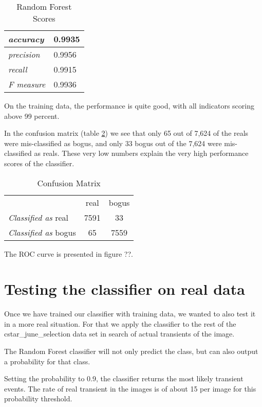 \begin{table}
\centering
\begin{tabular}{| >{\itshape}l | l |}
  \hline
  accuracy & 0.9935 \\ \hline
  precision & 0.9956 \\ \hline
  recall & 0.9915 \\ \hline
  F measure & 0.9936 \\ \hline
\end{tabular}
\caption{Random Forest Scores}
\label{mlscores}
\end{table}

On the training data, the performance is quite good, with all indicators scoring above 99 percent.

In the confusion matrix (table \ref{mlconfusionmatrix}) we see that only 65 out of 7,624 of the reals were mis-classified as bogus, and only 33 bogus out of the 7,624 were mis-classified as reals. These very low numbers explain the very high performance scores of the classifier.

\begin{table}
\centering
\begin{tabular}{ l|c|c| }
\multicolumn{1}{r}{}
 &  \multicolumn{1}{c}{real}
 & \multicolumn{1}{c}{bogus} \\
\cline{2-3}
{\it Classified as} real & 7591 & 33 \\
\cline{2-3}
{\it Classified as} bogus & 65 & 7559 \\
\cline{2-3}
\end{tabular}
\caption{Confusion Matrix}
\label{mlconfusionmatrix}
\end{table}

The ROC curve is presented in figure ??.

\section{Testing the classifier on real data}

Once we have trained our classifier with training data, we wanted to also test it in a more real situation. For that we apply the classifier to the rest of the cstar\_june\_selection data set in search of actual transients of the image.

The Random Forest classifier will not only predict the class, but can also output a probability for that class.

Setting the probability to 0.9, the classifier returns the most likely transient events. The rate of real transient in the images is of about 15 per image for this probability threshold.

